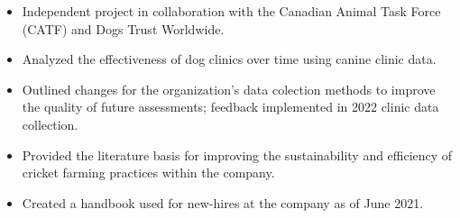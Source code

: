 \documentclass[10pt,a4paper,ragged2e]{altacv}
\begin{document}

\begin{fullwidth}
\makecvheader
\end{fullwidth}




\begin{itemize}
\item Independent project in collaboration with the Canadian Animal Task Force (CATF) and Dogs Trust Worldwide.
\item Analyzed the effectiveness of dog clinics over time using canine clinic data.
\item Outlined changes for the organization's data colection methods to improve the quality of future assessments; feedback implemented in 2022 clinic data collection.
\end{itemize}
\divider\small

\begin{itemize}
\item Provided the literature basis for improving the sustainability and efficiency of cricket farming practices within the company.
\item Created a handbook used for new-hires at the company as of June 2021.
\end{itemize} 
\divider\small
\end{document}
